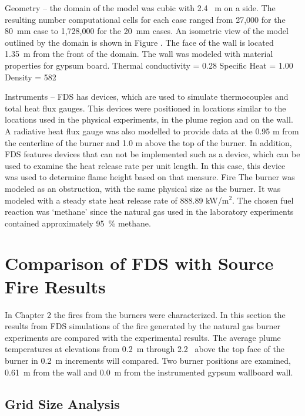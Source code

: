 \documentclass[twoside]{uocthesis}
\begin{document}
Geometry – the domain of the model was cubic with 2.4~ m on a side.  The resulting number computational cells for each case ranged from 27,000 for the 80~mm case to 1,728,000 for the 20~mm cases.   An isometric view of the model outlined by the domain is shown in Figure     .  The face of the wall is located 1.35~m from the front of the domain.  
The wall was modeled with material properties for gypsum board.
Thermal conductivity = 0.28
Specific Heat = 1.00
Density = 582

Instruments – FDS has devices, which are used to simulate thermocouples and total heat flux gauges.  This devices were positioned  in locations similar to the locations used in the physical experiments, in the plume region and on the wall.   A radiative heat flux gauge was also modelled to provide data at the 0.95 m from the centerline of the burner and 1.0 m above the top of the burner.  
In addition, FDS features devices that can not be implemented such as a device, which can be used to examine the heat release rate per unit length.  In this case, this device was used to determine flame height based on that measure.     
Fire 
The burner was modeled as an obstruction, with the same physical size as the burner.  It was modeled with a steady state heat release rate of 888.89 kW/m$^2$.   The chosen fuel reaction was `methane' since the natural gas used in the laboratory experiments contained approximately 95~\% methane.  


\section{Comparison of FDS with Source Fire Results}

In Chapter 2 the fires from the burners were characterized.  In this section the results from FDS simulations of the fire generated by the natural gas burner experiments are compared with the experimental results.  The average plume temperatures at elevations from 0.2~m through 2.2~ above the top face of the burner in 0.2~m increments will compared.  Two burner positions are examined, 0.61~m from the wall and 0.0~m from the instrumented gypsum wallboard wall.  


\subsection{Grid Size Analysis}
\end{document}
